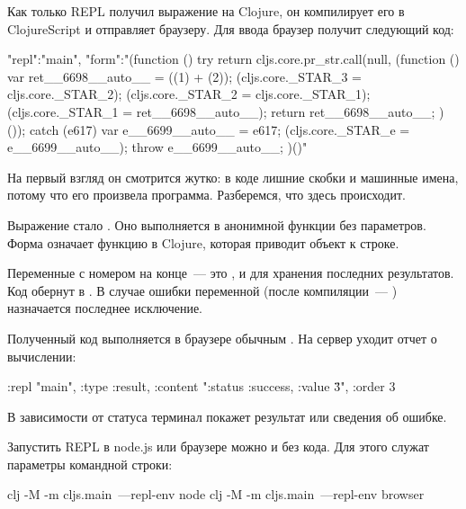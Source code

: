 Как только REPL получил выражение на Clojure, он компилирует его в ClojureScript и отправляет браузеру. Для ввода  браузер получит следующий код:

\begin{english}
  \begin{json}
{"repl":"main", "form":"(function () {
  try {
    return cljs.core.pr_str.call(null, (function () {
      var ret__6698__auto__ = ((1) + (2));
      (cljs.core._STAR_3 = cljs.core._STAR_2);
      (cljs.core._STAR_2 = cljs.core._STAR_1);
      (cljs.core._STAR_1 = ret__6698__auto__);
      return ret__6698__auto__;
    })());
  } catch (e617) {
    var e__6699__auto__ = e617;
    (cljs.core._STAR_e = e__6699__auto__);
    throw e__6699__auto__;
  }
})()"}
  \end{json}
\end{english}

На первый взгляд он смотрится жутко: в коде лишние скобки и машинные имена, потому что его произвела программа. Разберемся, что здесь происходит.

Выражение  стало . Оно выполняется в анонимной функции без параметров. Форма  означает функцию  в Clojure, которая приводит объект к строке.

Переменные  с номером на конце~--- это ,  и  для хранения последних результатов. Код обернут в . В случае ошибки переменной  (после компиляции~--- ) назначается последнее исключение.

Полученный код выполняется в браузере обычным . На сервер уходит отчет о вычислении:

\begin{english}
  \begin{clojure}
{:repl "main",
 :type :result,
 :content "{:status :success, :value \"3\"}",
 :order 3}
  \end{clojure}
\end{english}

В зависимости от статуса терминал покажет результат или сведения об ошибке.

Запустить REPL в node.js или браузере можно и без кода. Для этого служат параметры командной строки:

\begin{english}
  \begin{bash}
clj -M -m cljs.main~---repl-env node
clj -M -m cljs.main~---repl-env browser
  \end{bash}
\end{english}

